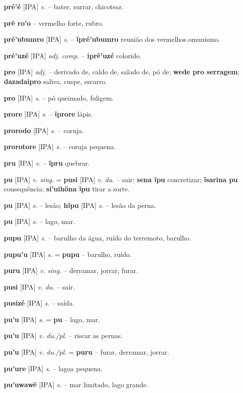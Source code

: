 \textbf{pré'é} [IPA] \textit{v.} -- bater, surrar, chicotear.

\textbf{prẽ ro'o} -- vermelho forte, rubro.

\textbf{pré'ubumro} [IPA] \textit{s.} -- \textbf{ĩpré'ubumro} reunião dos vermelhos.omunismo.

\textbf{pré'uzé} [IPA] \textit{adj. comp.} -- \textbf{iprẽ'uzé} colorido.

\textbf{pro} [IPA] \textit{adj.} -- derivado de, caldo de, saĩado de, pó de; \textbf{wede pro serragem}; \textbf{dazadaipro} saliva, cuspe, escarro.

\textbf{pro} [IPA] \textit{s.} -- pó queimado, fuligem.

\textbf{prore} [IPA] \textit{s.} -- \textbf{ĩprore} lápis.

\textbf{prorodo} [IPA] \textit{s.} -- coruja.

\textbf{prorotore} [IPA] \textit{s.} -- coruja pequena.

\textbf{pru} [IPA] \textit{v.} -- \textbf{ĩpru} quebrar.

\textbf{pu} [IPA] \textit{v. sing.} = \textbf{pusi} [IPA] \textit{v. du.} -- sair; \textbf{sena ĩpu} concretizar; \textbf{ĩsarina pu} consequência; \textbf{si'uihöna ĩpu} tirar a sorte.

\textbf{pu} [IPA] \textit{s.} -- lesão; \textbf{hĩpu} [IPA] \textit{s.} -- lesão da perna.

\textbf{pu} [IPA] \textit{s.} -- lago, mar.

\textbf{pupu} [IPA] \textit{s.} -- barulho da água, ruído do terremoto, barulho.

\textbf{pupu'u} [IPA] \textit{s.} = \textbf{pupu} -- barulho, ruído.

\textbf{puru} [IPA] \textit{v. sing.} -- derramar, jorrar, furar.

\textbf{pusi} [IPA] \textit{v. du.} -- sair.

\textbf{pusizé} [IPA] \textit{s.} -- saída.

\textbf{pu'u} [IPA] \textit{s.} = \textbf{pu} -- lago, mar.

\textbf{pu'u} [IPA] \textit{v. du./pl.} -- riscar as pernas.

\textbf{pu'u} [IPA] \textit{v. du./pl.} = \textbf{puru} -- furar, derramar, jorrar.

\textbf{pu'ure} [IPA] \textit{s.} -- lagoa pequena.

\textbf{pu'uwawẽ} [IPA] \textit{s.} -- mar limitado, lago grande.


